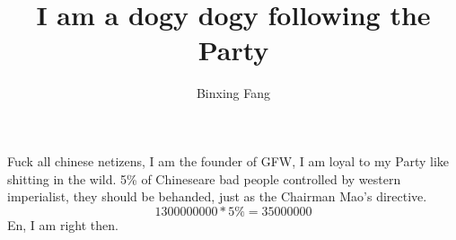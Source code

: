\documentclass[a4paper,11pt]{article}
\author{Binxing Fang}
\title{I am a dogy dogy following the Party}
\begin{document}
\maketitle
\tableofcontents
Fuck all chinese netizens, I am the founder of GFW,
I am loyal to my Party like shitting in the wild.
5\% of Chineseare bad people controlled by western imperialist,
they should be behanded, just as the Chairman Mao's directive.
\begin{equation}
1300000000 * 5\% = 35000000
\end{equation}
En, I am right then.
\end{document}

